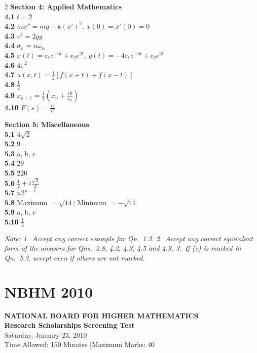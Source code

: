 \documentclass[11pt,a4paper]{article}
\newcommand{\examheader}[4]{%
  \clearpage
  \section{#1}
  \begin{center}
    {\large\bfseries NATIONAL BOARD FOR HIGHER MATHEMATICS}\\[3pt]
    {\bfseries #2}\\[2pt]
    {#3}\\[2pt]
    {\small #4}
  \end{center}
  \vspace{4pt}
}
\begin{document}
\begin{multicols}{2}
\medskip
\textbf{Section 4: Applied Mathematics}\\
\textbf{4.1} $t = 2$\\
\textbf{4.2} $mx'' = mg - k(x')^2,\ x(0) = x'(0) = 0$\\
\textbf{4.3} $v^2 = 2gy$\\
\textbf{4.4} $\sigma_n = n\omega_n$\\
\textbf{4.5} $x(t) = c_1 e^{-3t} + c_2 e^{2t},\ y(t) = -4c_1 e^{-3t} + c_2 e^{2t}$\\
\textbf{4.6} $4\pi^2$\\
\textbf{4.7} $u(x, t) = \frac{1}{2}[f(x + t) + f(x - t)]$\\
\textbf{4.8} $\frac{1}{2}$\\
\textbf{4.9} $x_{n+1} = \frac{1}{2}\left(x_n + \frac{10}{x_n}\right)$\\
\textbf{4.10} $F(s) = \frac{6}{s^4}$

\medskip
\textbf{Section 5: Miscellaneous}\\
\textbf{5.1} $4\sqrt{2}$\\
\textbf{5.2} $9$\\
\textbf{5.3} a, b, c\\
\textbf{5.4} $29$\\
\textbf{5.5} $220$\\
\textbf{5.6} $\frac{1}{2} + i\frac{\sqrt{3}}{2}$\\
\textbf{5.7} $n2^{n-1}$\\
\textbf{5.8} Maximum $= \sqrt{14}$; Minimum $= -\sqrt{14}$\\
\textbf{5.9} a, b, c\\
\textbf{5.10} $\frac{1}{3}$

\medskip
\noindent\emph{Note: 1.\ Accept any correct example for Qn.\ 1.3. 2.\ Accept any correct equivalent form of the answers for Qns.\ 2.8, 4.2, 4.3, 4.5 and 4.9. 3.\ If (c) is marked in Qn.\ 5.3, accept even if others are not marked.}
\end{multicols}
\examheader{NBHM 2010}{Research Scholarships Screening Test}{Saturday, January 23, 2010}{Time Allowed: 150 Minutes \quad|\quad Maximum Marks: 40}
\end{document}
